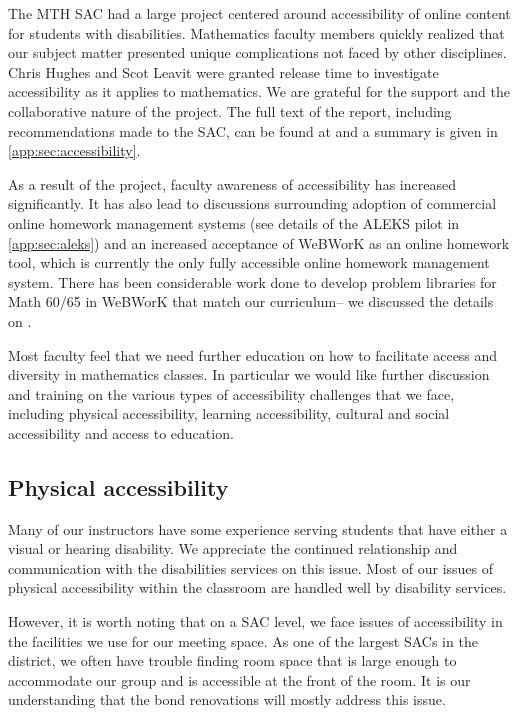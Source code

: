 The MTH SAC had a large project centered around accessibility of online content
for students with disabilities. Mathematics faculty members quickly realized
that our subject matter presented unique complications not faced by other
disciplines. Chris Hughes and Scot Leavit were granted release time to
investigate accessibility as it applies to mathematics. We are grateful for the
support and the collaborative nature of the project.\label{needs:page:disabilityservices} 
The full text of the
report, including recommendations made to the SAC, can be found at
\cite{accessibilityproject} and a summary is given in
\vref{app:sec:accessibility}.

As a result of the project, faculty awareness of accessibility has increased
significantly. It has also lead to discussions surrounding adoption of
commercial online homework management systems (see details of the ALEKS pilot
in \vref{app:sec:aleks}) and an increased acceptance of WeBWorK as an online
homework tool, which is currently the only fully accessible online homework
management system. There has been considerable work done to develop problem
libraries for Math 60/65 in WeBWorK that match our curriculum-- we discussed 
the details on .

Most faculty feel that we need further education on how to facilitate access
and diversity in mathematics classes. In particular we would like further
discussion and training on the various types of accessibility challenges that
we face, including physical accessibility, learning accessibility, cultural and
social accessibility and access to education.

\subsection{Physical accessibility}
Many of our instructors have some experience serving students that have either
a visual or hearing disability. We appreciate the continued relationship and
communication with the disabilities services on this issue. Most of our issues
of physical accessibility within the classroom are handled well by disability
services. 

However, it is worth noting that on a SAC level, we face issues of
accessibility in the facilities we use for our meeting space. As one of the
largest SACs in the district, we often have trouble finding room space that is
large enough to accommodate our group and is accessible at the front of the
room. It is our understanding that the bond renovations will mostly address
this issue.

